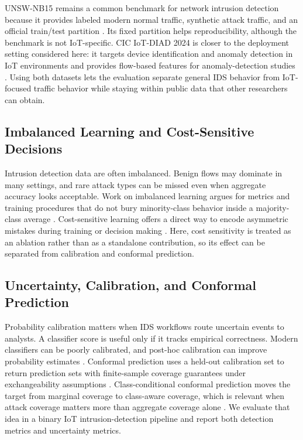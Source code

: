 \documentclass[11pt]{article}
\begin{document}
UNSW-NB15 remains a common benchmark for network intrusion detection because it provides labeled modern normal traffic, synthetic attack traffic, and an official train/test partition \cite{moustafa2015unsw,moustafa2016evaluation,unsw_nb15_dataset}. Its fixed partition helps reproducibility, although the benchmark is not IoT-specific. CIC IoT-DIAD 2024 is closer to the deployment setting considered here: it targets device identification and anomaly detection in IoT environments and provides flow-based features for anomaly-detection studies \cite{rabbani2025device,unb_2024_ciciotdiad}. Using both datasets lets the evaluation separate general IDS behavior from IoT-focused traffic behavior while staying within public data that other researchers can obtain.

\subsection{Imbalanced Learning and Cost-Sensitive Decisions}

Intrusion detection data are often imbalanced. Benign flows may dominate in many settings, and rare attack types can be missed even when aggregate accuracy looks acceptable. Work on imbalanced learning argues for metrics and training procedures that do not bury minority-class behavior inside a majority-class average \cite{he2009imbalanced}. Cost-sensitive learning offers a direct way to encode asymmetric mistakes during training or decision making \cite{elkan2001foundations}. Here, cost sensitivity is treated as an ablation rather than as a standalone contribution, so its effect can be separated from calibration and conformal prediction.

\subsection{Uncertainty, Calibration, and Conformal Prediction}

Probability calibration matters when IDS workflows route uncertain events to analysts. A classifier score is useful only if it tracks empirical correctness. Modern classifiers can be poorly calibrated, and post-hoc calibration can improve probability estimates \cite{guo2017calibration}. Conformal prediction uses a held-out calibration set to return prediction sets with finite-sample coverage guarantees under exchangeability assumptions \cite{vovk2022algorithmic,angelopoulos2023conformal}. Class-conditional conformal prediction moves the target from marginal coverage to class-aware coverage, which is relevant when attack coverage matters more than aggregate coverage alone \cite{ding2023class}. We evaluate that idea in a binary IoT intrusion-detection pipeline and report both detection metrics and uncertainty metrics.
\end{document}
